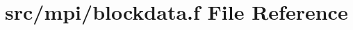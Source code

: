 \hypertarget{mpi_2blockdata_8f}{\section{src/mpi/blockdata.f File Reference}
\label{mpi_2blockdata_8f}
}
